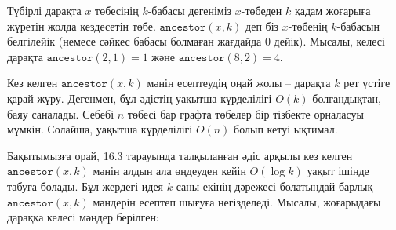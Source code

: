 Түбірлі дарақта $x$ төбесінің $k$-бабасы дегеніміз $x$-төбеден
$k$ қадам жоғарыға жүретін жолда кездесетін төбе.
$\texttt{ancestor}(x,k)$ деп біз $x$-төбенің $k$-бабасын белгілейік
(немесе сәйкес бабасы болмаған жағдайда $0$ дейік).
Мысалы, келесі дарақта 
$\texttt{ancestor}(2,1)=1$ және $\texttt{ancestor}(8,2)=4$.
\begin{center}
\end{center}

Кез келген $\texttt{ancestor}(x,k)$ мәнін есептеудің оңай жолы -- 
дарақта $k$ рет үстіге қарай жүру.
Дегенмен, бұл әдістің уақытша күрделілігі $O(k)$ болғандықтан, баяу саналады.
Себебі $n$ төбесі бар графта төбелер бір тізбекте 
орналасуы мүмкін. Солайша, уақытша күрделілігі $O(n)$ болып кетуі ықтимал.


Бақытымызға орай, 16.3 тарауында талқыланған әдіс арқылы 
кез келген $\texttt{ancestor}(x,k)$ мәнін алдын ала
өңдеуден кейін $O(\log k)$ уақыт ішінде табуға болады. 
Бұл жердегі идея $k$ саны екінің дәрежесі болатындай 
барлық $\texttt{ancestor}(x,k)$ мәндерін есептеп шығуға негізделеді.
Мысалы, жоғарыдағы дараққа келесі мәндер берілген:

